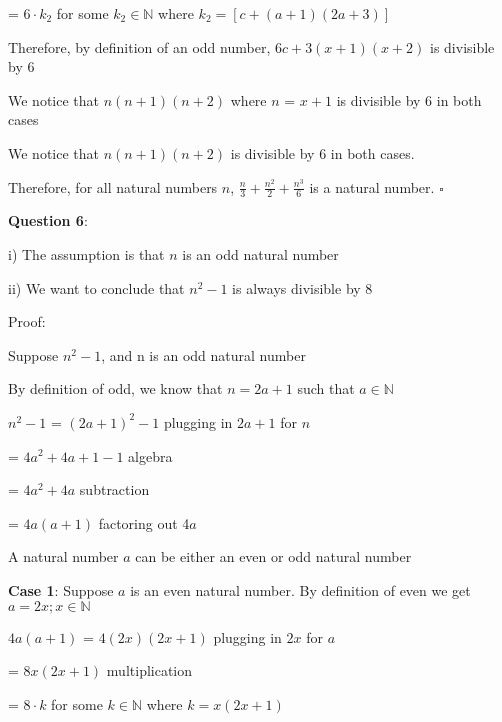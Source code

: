 \documentclass{article} %
\newcommand{\question}[2][]{\begin{flushleft}
        \textbf{Question #1}: \textit{#2}

\end{flushleft}}
\begin{document}
    \tabto*{5.24cm} = $6 \cdot k_{2}$ for some $k_{2} \in \mathbb{N}$ where $k_{2} = [c + (a+1)(2a+3)]$


    \tabto*{2cm} Therefore, by definition of an odd number, $6c + 3(x+1)(x+2)$ is divisible by 6

    \tabto*{1cm}We notice that $n(n + 1)(n + 2)$ where $n$ = $x + 1$ is divisible by 6 in both cases

    We notice that $n(n + 1)(n + 2)$ is divisible by 6 in both cases.

    \vspace*{0.2cm}

    Therefore, for all natural numbers $n$, $\frac{n}{3} + \frac{n^2}{2} + \frac{n^3}{6}$ is a natural number. $\square$




    \question[6]{}

    i) The assumption is that $n$ is an odd natural number

    ii) We want to conclude that $n^2 -1$ is always divisible by 8

    Proof:

    Suppose $n^2-1$, and n is an odd natural number
    
    By definition of odd, we know that $n = 2a+1$ such that $a \in \mathbb{N}$

    $n^2-1$ = $(2a+1)^2-1$ \tabto*{5cm}plugging in $2a + 1$ for $n$

    \tabto*{1.64cm} = $4a^2 + 4a + 1 -1$ \tabto*{5cm}algebra

    \tabto*{1.64cm} = $4a^2 + 4a$ \tabto*{5cm}subtraction

    \tabto*{1.64cm} = $4a(a + 1)$ \tabto*{5cm}factoring out 4$a$

    A natural number $a$ can be either an even or odd natural number 

    \vspace*{0.2cm}

    \textbf{Case 1}: Suppose $a$ is an even natural number. By definition of even we get $a = 2x; x \in \mathbb{N}$

    $4a(a + 1)$ = $4(2x)(2x + 1)$ \tabto*{5cm}plugging in $2x$ for $a$

    \tabto*{2.08cm} = $8x(2x + 1)$ \tabto*{5cm}multiplication

    \tabto*{2.08cm} = $8\cdot k$ for some $k \in \mathbb{N}$ where $k = x(2x + 1)$
\end{document}
